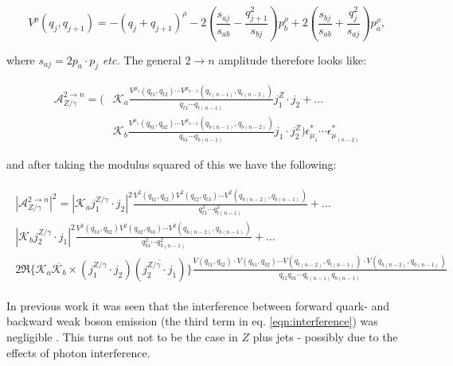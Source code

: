 	\begin{equation}
		V^\rho(q_j, q_{j+1}) = -(q_j + q_{j+1})^\rho - 2\left(\frac{s_{aj}}{s_{ab}} -
			\frac{q^2_{j+1}}{s_{bj}}\right)p_b^\rho + 2\left(\frac{s_{bj}}{s_{ab}} +
			\frac{q_j^2}{s_{aj}}\right)p_a^\rho,
			\label{eqn:effectivevertex}
	\end{equation}

	where $s_{aj} = 2p_a\cdot p_j$ \emph{etc.}  The general $2\rightarrow n$ amplitude therefore looks like:

	\begin{align}
		\mathcal{A}^{2\rightarrow n}_{Z/\gamma} = \Bigg(&\mathcal{K}_a\frac{V^{\mu_1}(q_{t1}, q_{t2})\cdots
			V^{\mu_{n-2}}(q_{t(n-1)}, q_{t(n-2)})} {q_{t1}\cdots q_{t(n-1)}} j_1^Z\cdot j_2 +\ldots\\\nonumber
			&\mathcal{K}_b\frac{V^{\mu_1}(q_{b1}, q_{b2})\cdots V^{\mu_{n-2}}(q_{b(n-1)}, q_{b(n-2)})} {q_{b1}
			\cdots q_{b(n-1)}} j_1  \cdot j_2^Z\Bigg)\epsilon^*_{\mu_1}\cdots\epsilon^*_{\mu_{(n-2)}}
	\end{align}

	and after taking the modulus squared of this we have the following:

	\begin{align}
	\begin{split}
		|\mathcal{A}_{Z/\gamma}^{2\rightarrow n}|^2 = \left|\mathcal{K}_a j_1^{Z/\gamma}\cdot j_2\right|^2
			\frac{V^2(q_{t1}, q_{t2}) V^2(q_{t2}, q_{t3}) \cdots V^2(q_{b(n-2)}, q_{b(n-1)})}{q^2_{t1}\cdots
			q^2_{t(n-1)}} +\ldots\\
			\left|\mathcal{K}_b j_2^{Z/\gamma}\cdot j_1\right|^2 \frac{V^2(q_{b1}, q_{b2}) V^2(q_{b2}, q_{b3})
			\cdots V^2(q_{b(n-2)}, q_{b(n-1)})}{q^2_{b1}\cdots q^2_{b(n-1)}} +\ldots\\
			2\Re\{\mathcal{K}_a\overline{\mathcal{K}_b} \times (j_1^{Z/\gamma}\cdot j_2)(\overline{j_2^{Z/\gamma}\cdot
			j_1})\}\frac{V(q_{t1}, q_{t2})\cdot V(q_{b1}, q_{b2})\cdots V(q_{t(n-2)}, q_{t(n-1)})\cdot V(q_{b(n-2)},
			q_{b(n-1)})}{q_{t1}q_{b1}\cdots q_{t(n-1)}q_{b(n-1)}}
			\label{eqn:interference}
	\end{split}
	\end{align}

	In previous work it was seen that the interference between forward quark- and backward weak boson emission
	(the third term in eq. \eqref{eqn:interference}) was negligible \cite{Wjets}.  This turns out not to be
	the case in $Z$ plus jets - possibly due to the effects of photon interference.

